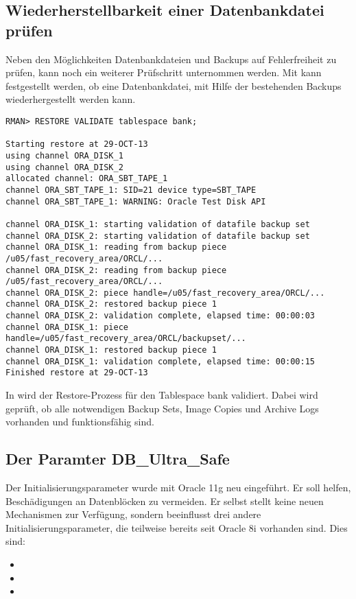       \subsection{Wiederherstellbarkeit einer Datenbankdatei pr\"ufen}
        Neben den M\"oglichkeiten Datenbankdateien und Backups auf Fehlerfreiheit zu pr\"ufen, kann noch ein weiterer Pr\"ufschritt unternommen werden. Mit  kann festgestellt werden, ob eine Datenbankdatei, mit Hilfe der bestehenden Backups wiederhergestellt werden kann.
        \begin{lstlisting}[caption={Kann der Tablespace \identifier{bank} wiederhergestellt werden?},label=admin1404,language=rman]
RMAN> RESTORE VALIDATE tablespace bank;

Starting restore at 29-OCT-13
using channel ORA_DISK_1
using channel ORA_DISK_2
allocated channel: ORA_SBT_TAPE_1
channel ORA_SBT_TAPE_1: SID=21 device type=SBT_TAPE
channel ORA_SBT_TAPE_1: WARNING: Oracle Test Disk API

channel ORA_DISK_1: starting validation of datafile backup set
channel ORA_DISK_2: starting validation of datafile backup set
channel ORA_DISK_1: reading from backup piece /u05/fast_recovery_area/ORCL/...
channel ORA_DISK_2: reading from backup piece /u05/fast_recovery_area/ORCL/...
channel ORA_DISK_2: piece handle=/u05/fast_recovery_area/ORCL/...
channel ORA_DISK_2: restored backup piece 1
channel ORA_DISK_2: validation complete, elapsed time: 00:00:03
channel ORA_DISK_1: piece handle=/u05/fast_recovery_area/ORCL/backupset/...
channel ORA_DISK_1: restored backup piece 1
channel ORA_DISK_1: validation complete, elapsed time: 00:00:15
Finished restore at 29-OCT-13
        \end{lstlisting}
        In  wird der Restore-Prozess f\"ur den Tablespace bank validiert. Dabei wird gepr\"uft, ob alle notwendigen Backup Sets, Image Copies und Archive Logs vorhanden und funktionsf\"ahig sind.
      \subsection{Der Paramter DB\_Ultra\_Safe}
        Der Initialisierungsparameter  wurde mit Oracle 11g neu eingef\"uhrt. Er soll helfen, Besch\"adigungen an Datenbl\"ocken zu vermeiden. Er selbst stellt keine neuen Mechanismen zur Verf\"ugung, sondern beeinflusst drei andere Initialisierungsparameter, die teilweise bereits seit Oracle 8i vorhanden sind. Dies sind:
        \begin{itemize}
          \item {}
          \item {}
          \item {}
        \end{itemize}
